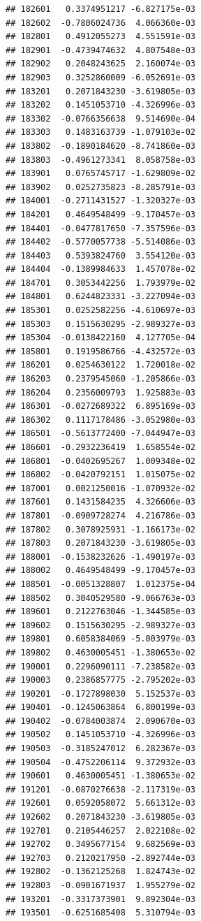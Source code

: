 \documentclass[ignorenonframetext,]{beamer}
\begin{document}
\begin{frame}[fragile]
\begin{verbatim}
## 182601   0.3374951217 -6.827175e-03
## 182602  -0.7806024736  4.066360e-03
## 182801   0.4912055273  4.551591e-03
## 182901  -0.4739474632  4.807548e-03
## 182902   0.2048243625  2.160074e-03
## 182903   0.3252860009 -6.052691e-03
## 183201   0.2071843230 -3.619805e-03
## 183202   0.1451053710 -4.326996e-03
## 183302  -0.0766356638  9.514690e-04
## 183303   0.1483163739 -1.079103e-02
## 183802  -0.1890184620 -8.741860e-03
## 183803  -0.4961273341  8.058758e-03
## 183901   0.0765745717 -1.629809e-02
## 183902   0.0252735823 -8.285791e-03
## 184001  -0.2711431527 -1.320327e-03
## 184201   0.4649548499 -9.170457e-03
## 184401  -0.0477817650 -7.357596e-03
## 184402  -0.5770057738 -5.514086e-03
## 184403   0.5393824760  3.554120e-03
## 184404  -0.1389984633  1.457078e-02
## 184701   0.3053442256  1.793979e-02
## 184801   0.6244823331 -3.227094e-03
## 185301   0.0252582256 -4.610697e-03
## 185303   0.1515630295 -2.989327e-03
## 185304  -0.0138422160  4.127705e-04
## 185801   0.1919586766 -4.432572e-03
## 186201   0.0254630122  1.720018e-02
## 186203   0.2379545060 -1.205866e-03
## 186204   0.2356009793  1.925883e-03
## 186301  -0.0272689322  6.895169e-03
## 186302   0.1117178486 -3.052980e-03
## 186501  -0.5613772400 -7.044947e-03
## 186601  -0.2932236419  1.658554e-02
## 186801  -0.0402695267  1.009348e-02
## 186802  -0.0420792151  1.015075e-02
## 187001   0.0021250016 -1.070932e-02
## 187601   0.1431584235  4.326606e-03
## 187801  -0.0909728274  4.216786e-03
## 187802   0.3078925931 -1.166173e-02
## 187803   0.2071843230 -3.619805e-03
## 188001  -0.1538232626 -1.490197e-03
## 188002   0.4649548499 -9.170457e-03
## 188501  -0.0051328807  1.012375e-04
## 188502   0.3040529580 -9.066763e-03
## 189601   0.2122763046 -1.344585e-03
## 189602   0.1515630295 -2.989327e-03
## 189801   0.6058384069 -5.003979e-03
## 189802   0.4630005451 -1.380653e-02
## 190001   0.2296090111 -7.238582e-03
## 190003   0.2386857775 -2.795202e-03
## 190201  -0.1727898030  5.152537e-03
## 190401  -0.1245063864  6.800199e-03
## 190402  -0.0784003874  2.090670e-03
## 190502   0.1451053710 -4.326996e-03
## 190503  -0.3185247012  6.282367e-03
## 190504  -0.4752206114  9.372932e-03
## 190601   0.4630005451 -1.380653e-02
## 191201  -0.0870276638 -2.117319e-03
## 192601   0.0592058072  5.661312e-03
## 192602   0.2071843230 -3.619805e-03
## 192701   0.2105446257  2.022108e-02
## 192702   0.3495677154  9.682569e-03
## 192703   0.2120217950 -2.892744e-03
## 192802  -0.1362125268  1.824743e-02
## 192803  -0.0901671937  1.955279e-02
## 193201  -0.3317373901  9.892304e-03
## 193501  -0.6251685408  5.310794e-03

\end{verbatim}
\end{frame}
\end{document}

